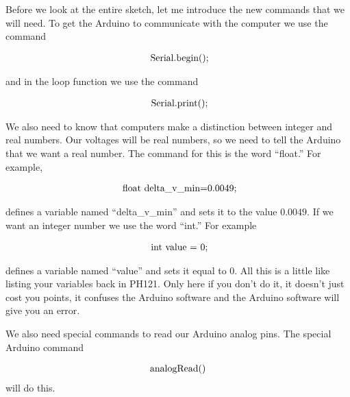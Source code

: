 Before we look at the entire sketch, let me introduce the new commands that we will need. To get the Arduino to communicate with the computer we use the command 

\begin{equation*}
	\begin{tabular}{l}
		\ Serial.begin();
	\end{tabular}
\end{equation*}

\noindent and in the loop function we use the command

\begin{equation*}
	\begin{tabular}{l}
		\ Serial.print();
	\end{tabular}
\end{equation*}

We also need to know that computers make a distinction between integer and real numbers. Our voltages will be real numbers, so we need to tell the Arduino that we want a real number. The command for this is the word ``float.'' For example,

\begin{equation*}
	\begin{tabular}{l}
		\ float\ delta\_v\_min=0.0049;
	\end{tabular}
\end{equation*}

\noindent defines a variable named ``delta\_v\_min'' and sets it to the value $0.0049.$ If we want an integer number we use the word ``int.''  For example 

\begin{equation*}
	\begin{tabular}{l}
		\ int\ value\ =\ 0;
	\end{tabular}
\end{equation*}

\noindent defines a variable named ``value'' and sets it equal to $0.$ All this is a little like listing your variables back in PH121. Only here if you don't do it, it doesn't just cost you points, it confuses the Arduino software and the Arduino software will give you an error.

We also need special commands to read our Arduino analog pins. The special Arduino command 

\begin{equation*}
	\begin{tabular}{l}
		analogRead()
	\end{tabular}
\end{equation*}
will do this.

